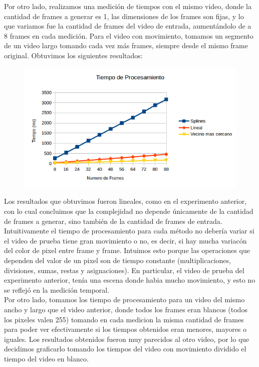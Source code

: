 Por otro lado, realizamos una medición de tiempos con el mismo video, donde la cantidad de frames a generar es 1,   las dimensiones de los frames son fijas, y lo que variamos fue la cantidad de frames del video de entrada, aumentándolo de a 8 frames en cada medición. Para el video con movimiento, tomamos un segmento de un video largo tomando cada vez más frames, siempre desde el mismo frame original. Obtuvimos los siguientes resultados:

\begin{figure}
  \vspace{-20pt}
  \begin{center}
    \includegraphics[scale= 0.6]{imagenes/aumentandoFramesMessi.png}
  \end{center}
  \vspace{-10pt}
  \vspace{-10pt}
\end{figure}

Los resultados que obtuvimos fueron lineales, como en el experimento anterior, con lo cual concluimos que la complejidad no depende únicamente de la cantidad de frames a generar, sino también de la cantidad de frames de entrada.\\

Intuitivamente el tiempo de procesamiento para cada método no debería variar si el video de prueba tiene gran movimiento o no, es decir, si hay mucha variacón del color de pixel entre frame y frame. Intuimos esto porque las operaciones que dependen del valor de un pixel son de tiempo constante (multiplicaciones, divisiones, sumas, restas y asignaciones). En particular, el video de prueba del experimento anterior, tenía una escena donde habia mucho movimiento, y esto no se reflejó en la medición temporal. \\
Por otro lado, tomamos los tiempo de procesamiento para un video del mismo ancho y largo que el video anterior, donde todos los frames eran blancos (todos los pixeles valen 255) tomando en cada medicion la misma cantidad de frames para poder ver efectivamente si los tiempos obtenidos eran menores, mayores o iguales. Los resultados obtenidos fueron muy parecidos al otro video, por lo que decidimos graficarlo tomando los tiempos del video con movimiento dividido el tiempo del video en blanco.

